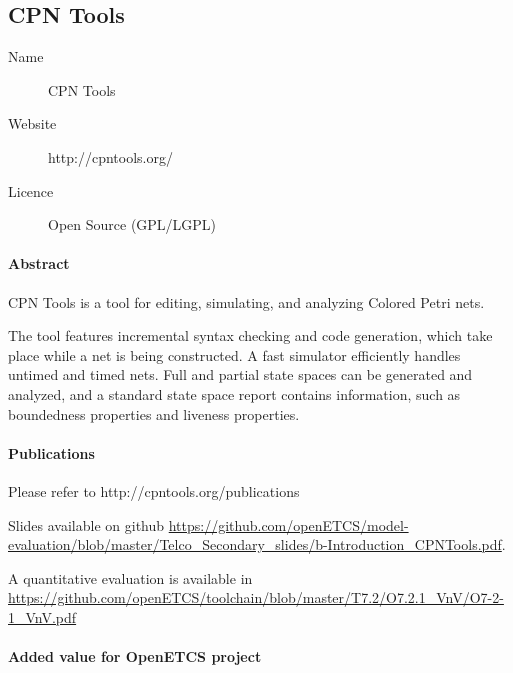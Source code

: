 \subsection{CPN Tools}
\label{sec:CPN-Tools}

\begin{description}
\item[Name] CPN Tools
\item[Website] http://cpntools.org/
\item[Licence] Open Source (GPL/LGPL)
\end{description}

\paragraph{Abstract} CPN Tools is a tool for editing, simulating, and analyzing Colored Petri nets.

The tool features incremental syntax checking and code generation, which take place while a net is being constructed. A fast simulator efficiently handles untimed and timed nets. Full and partial state spaces can be generated and analyzed, and a standard state space report contains information, such as boundedness properties and liveness properties.

\paragraph{Publications} Please refer to http://cpntools.org/publications

Slides available on github \url{https://github.com/openETCS/model-evaluation/blob/master/Telco_Secondary_slides/b-Introduction_CPNTools.pdf}.

A quantitative evaluation is available in \url{https://github.com/openETCS/toolchain/blob/master/T7.2/O7.2.1_VnV/O7-2-1_VnV.pdf}

\paragraph{Added value for OpenETCS project}

